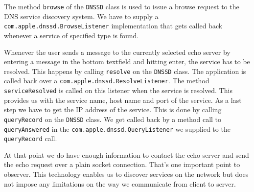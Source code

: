 The method \texttt{browse} of the \texttt{DNSSD} class is used to issue a browse request to the DNS service discovery system. We have to supply a \texttt{com.apple.dnssd.BrowseListener} implementation that gets called back whenever a service of specified type is found.

Whenever the user sends a message to the currently selected echo server by entering a message in the bottom textfield and hitting enter, the service has to be resolved. This happens by calling \texttt{resolve} on the \texttt{DNSSD} class. The application is called back over a \texttt{com.apple.dnssd.ResolveListener}. The method \texttt{serviceResolved} is called on this listener when the service is resolved. This provides us with the service name, host name and port of the service. As a last step we have to get the IP address of the service. This is done by calling \texttt{queryRecord} on the \texttt{DNSSD} class. We get called back by a method call to \texttt{queryAnswered} in the \texttt{com.apple.dnssd.QueryListener} we supplied to the \texttt{queryRecord} call.

At that point we do have enough information to contact the echo server and send the echo request over a plain socket connection. That's one important point to observer. This technology enables us to discover services on the network but does not impose any limitations on the way we communicate from client to server.